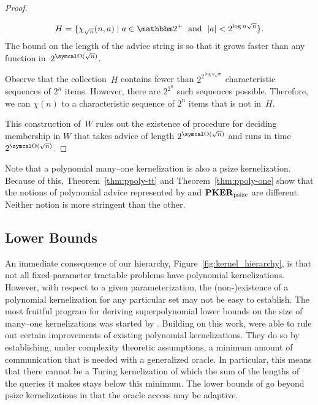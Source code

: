 \begin{proof}
\begin{codelisting}
\begin{codelisting}
\begin{equation*}
        H = \{\chi_{\sqrt{n}}(n, a) \st a \in \binary^+ \reland \length{a} < 2^{\log n \sqrt{n}}\}.
      \end{equation*}
      The bound on the length of the advice string is so that it grows faster than any function in~$2^{\bigO(\sqrt{n})}$.
    \item
      Observe that the collection~$H$ contains fewer than $2^{2^{\log n \sqrt{n}}}$ characteristic sequences of $2^n$ items.
      However, there are $2^{2^n}$ such sequences possible.
      Therefore, we can  $\chi(n)$ to a characteristic sequence of $2^n$ items that is not in~$H$.
    \end{codelisting}
  \end{codelisting}
  This construction of~$W$ rules out the existence of procedure for deciding membership in $W$ that takes advice of length $2^{\bigO(\sqrt{n})}$ and runs in time $2^{\bigO(\sqrt{n})}$.
\end{proof}

Note that a polynomial many--one kernelization is also a psize kernelization.
Because of this, Theorem~\ref{thm:ppoly-tt} and Theorem~\ref{thm:ppoly-one} show that the notions of polynomial advice represented by  and $\textnormal{\textbf{PKER}}_\textnormal{psize}$ are different.
Neither notion is more stringent than the other.

\subsection{Lower Bounds}
\label{sec:redundancy:lower_bounds}%
An immediate consequence of our hierarchy, Figure~\ref{fig:kernel_hierarchy}, is that not all fixed-parameter tractable problems have polynomial kernelizations.
However, with respect to a given parameterization, the (non-)existence of a polynomial kernelization for any particular set may not be easy to establish.
The most fruitful program for deriving superpolynomial lower bounds on the size of many--one kernelizations was started by \textcite{bodlaender2009problems}.
Building on this work, \textcite{dell2014satisfiability} were able to rule out certain improvements of existing polynomial kernelizations.
They do so by establishing, under complexity theoretic assumptions, a minimum amount of communication that is needed with a generalized oracle.
In particular, this means that there cannot be a Turing kernelization of which the sum of the lengths of the queries it makes stays below this minimum.
The lower bounds of \citeauthor{dell2014satisfiability} go beyond psize kernelizations in that the oracle access may be adaptive.

